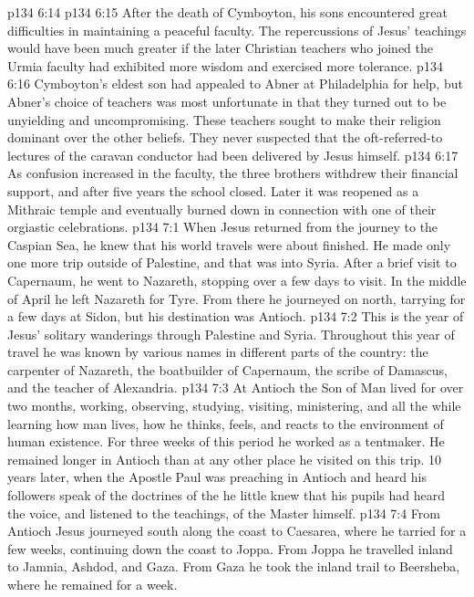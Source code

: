 \vs p134 6:14 \separatorshort
\vs p134 6:15 After the death of Cymboyton, his sons encountered great difficulties in maintaining a peaceful faculty. The repercussions of Jesus’ teachings would have been much greater if the later Christian teachers who joined the Urmia faculty had exhibited more wisdom and exercised more tolerance.
\vs p134 6:16 Cymboyton’s eldest son had appealed to Abner at Philadelphia for help, but Abner’s choice of teachers was most unfortunate in that they turned out to be unyielding and uncompromising. These teachers sought to make their religion dominant over the other beliefs. They never suspected that the oft\hyp{}referred\hyp{}to lectures of the caravan conductor had been delivered by Jesus himself.
\vs p134 6:17 As confusion increased in the faculty, the three brothers withdrew their financial support, and after five years the school closed. Later it was reopened as a Mithraic temple and eventually burned down in connection with one of their orgiastic celebrations.
\vs p134 7:1 When Jesus returned from the journey to the Caspian Sea, he knew that his world travels were about finished. He made only one more trip outside of Palestine, and that was into Syria. After a brief visit to Capernaum, he went to Nazareth, stopping over a few days to visit. In the middle of April he left Nazareth for Tyre. From there he journeyed on north, tarrying for a few days at Sidon, but his destination was Antioch.
\vs p134 7:2 This is the year of Jesus’ solitary wanderings through Palestine and Syria. Throughout this year of travel he was known by various names in different parts of the country: the carpenter of Nazareth, the boatbuilder of Capernaum, the scribe of Damascus, and the teacher of Alexandria.
\vs p134 7:3 At Antioch the Son of Man lived for over two months, working, observing, studying, visiting, ministering, and all the while learning how man lives, how he thinks, feels, and reacts to the environment of human existence. For three weeks of this period he worked as a tentmaker. He remained longer in Antioch than at any other place he visited on this trip. 10 years later, when the Apostle Paul was preaching in Antioch and heard his followers speak of the doctrines of the  he little knew that his pupils had heard the voice, and listened to the teachings, of the Master himself.
\vs p134 7:4 From Antioch Jesus journeyed south along the coast to Caesarea, where he tarried for a few weeks, continuing down the coast to Joppa. From Joppa he travelled inland to Jamnia, Ashdod, and Gaza. From Gaza he took the inland trail to Beersheba, where he remained for a week.
